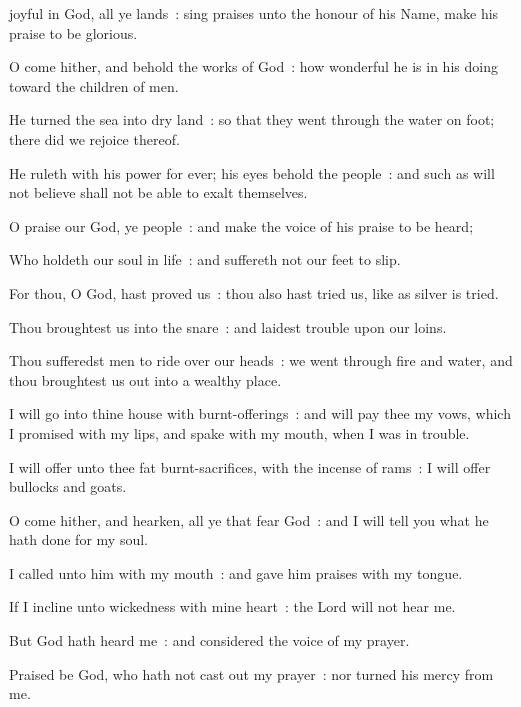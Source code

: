  joyful in God, all ye lands~: sing praises unto the honour of his Name, make his praise to be glorious.\par
{}
O come hither, and behold the works of God~: how wonderful he is in his doing toward the children of men.\par
{}He turned the sea into dry land~: so that they went through the water on foot; there did we rejoice thereof.\par
{}He ruleth with his power for ever; his eyes behold the people~: and such as will not believe shall not be able to exalt themselves.\par
{}O praise our God, ye people~: and make the voice of his praise to be heard;\par
{}Who holdeth our soul in life~: and suffereth not our feet to slip.\par
{}For thou, O God, hast proved us~: thou also hast tried us, like as silver is tried.\par
{}Thou broughtest us into the snare~: and laidest trouble upon our loins.\par
{}Thou sufferedst men to ride over our heads~: we went through fire and water, and thou broughtest us out into a wealthy place.\par
{}I will go into thine house with burnt-offerings~: and will pay thee my vows, which I promised with my lips, and spake with my mouth, when I was in trouble.\par
{}I will offer unto thee fat burnt-sacrifices, with the incense of rams~: I will offer bullocks and goats.\par
{}O come hither, and hearken, all ye that fear God~: and I will tell you what he hath done for my soul.\par
{}I called unto him with my mouth~: and gave him praises with my tongue.\par
{}If I incline unto wickedness with mine heart~: the Lord will not hear me.\par
{}But God hath heard me~: and considered the voice of my prayer.\par
{}Praised be God, who hath not cast out my prayer~: nor turned his mercy from me.\par

